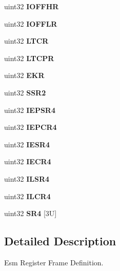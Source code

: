 \begin{DoxyCompactItemize}
uint32 {\bfseries I\+O\+F\+F\+HR}
\item 
\mbox{\label{structesmBase_a9da30c19d695a04472fb6f50f52974f8}} 
uint32 {\bfseries I\+O\+F\+F\+LR}
\item 
\mbox{\label{structesmBase_a1f6050dbdff0d9e294240d4bd0a042d2}} 
uint32 {\bfseries L\+T\+CR}
\item 
\mbox{\label{structesmBase_a336b5d520221ddedfe9dbf7bf83b6bad}} 
uint32 {\bfseries L\+T\+C\+PR}
\item 
\mbox{\label{structesmBase_acf71bf987383834aeebe1f323481bb8d}} 
uint32 {\bfseries E\+KR}
\item 
\mbox{\label{structesmBase_a223379ff2344faae3373e9076e311731}} 
uint32 {\bfseries S\+S\+R2}
\item 
\mbox{\label{structesmBase_a3f232e49a349c169c7531cc866efc051}} 
uint32 {\bfseries I\+E\+P\+S\+R4}
\item 
\mbox{\label{structesmBase_a381b45170e7f5460c11951a2e0b9e00a}} 
uint32 {\bfseries I\+E\+P\+C\+R4}
\item 
\mbox{\label{structesmBase_abaf1de68f276fb496d8fffed71ad87f6}} 
uint32 {\bfseries I\+E\+S\+R4}
\item 
\mbox{\label{structesmBase_a96988f2d7f164acc379eb8dfbbac4704}} 
uint32 {\bfseries I\+E\+C\+R4}
\item 
\mbox{\label{structesmBase_a9e98b7fd336140bdd150274f6a4b0e5b}} 
uint32 {\bfseries I\+L\+S\+R4}
\item 
\mbox{\label{structesmBase_aeff2eb30f562f0114ee9e81b8c410511}} 
uint32 {\bfseries I\+L\+C\+R4}
\item 
\mbox{\label{structesmBase_ad043005b53b18163271af246ba91996c}} 
uint32 {\bfseries S\+R4} \mbox{[}3\+U\mbox{]}
\end{DoxyCompactItemize}


\subsection{Detailed Description}
Esm Register Frame Definition. 

